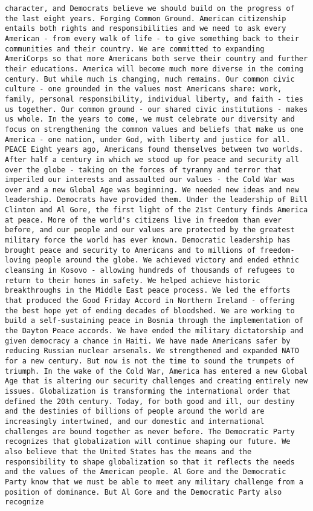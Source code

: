 \documentclass[
]{article}
\begin{document}
\begin{verbatim}
character, and Democrats believe we should build on the progress of the last eight years. Forging Common Ground. American citizenship entails both rights and responsibilities and we need to ask every American - from every walk of life - to give something back to their communities and their country. We are committed to expanding AmeriCorps so that more Americans both serve their country and further their educations. America will become much more diverse in the coming century. But while much is changing, much remains. Our common civic culture - one grounded in the values most Americans share: work, family, personal responsibility, individual liberty, and faith - ties us together. Our common ground - our shared civic institutions - makes us whole. In the years to come, we must celebrate our diversity and focus on strengthening the common values and beliefs that make us one America - one nation, under God, with liberty and justice for all. PEACE Eight years ago, Americans found themselves between two worlds. After half a century in which we stood up for peace and security all over the globe - taking on the forces of tyranny and terror that imperiled our interests and assaulted our values - the Cold War was over and a new Global Age was beginning. We needed new ideas and new leadership. Democrats have provided them. Under the leadership of Bill Clinton and Al Gore, the first light of the 21st Century finds America at peace. More of the world's citizens live in freedom than ever before, and our people and our values are protected by the greatest military force the world has ever known. Democratic leadership has brought peace and security to Americans and to millions of freedom-loving people around the globe. We achieved victory and ended ethnic cleansing in Kosovo - allowing hundreds of thousands of refugees to return to their homes in safety. We helped achieve historic breakthroughs in the Middle East peace process. We led the efforts that produced the Good Friday Accord in Northern Ireland - offering the best hope yet of ending decades of bloodshed. We are working to build a self-sustaining peace in Bosnia through the implementation of the Dayton Peace accords. We have ended the military dictatorship and given democracy a chance in Haiti. We have made Americans safer by reducing Russian nuclear arsenals. We strengthened and expanded NATO for a new century. But now is not the time to sound the trumpets of triumph. In the wake of the Cold War, America has entered a new Global Age that is altering our security challenges and creating entirely new issues. Globalization is transforming the international order that defined the 20th century. Today, for both good and ill, our destiny and the destinies of billions of people around the world are increasingly intertwined, and our domestic and international challenges are bound together as never before. The Democratic Party recognizes that globalization will continue shaping our future. We also believe that the United States has the means and the responsibility to shape globalization so that it reflects the needs and the values of the American people. Al Gore and the Democratic Party know that we must be able to meet any military challenge from a position of dominance. But Al Gore and the Democratic Party also recognize 
\end{verbatim}
\end{document}
